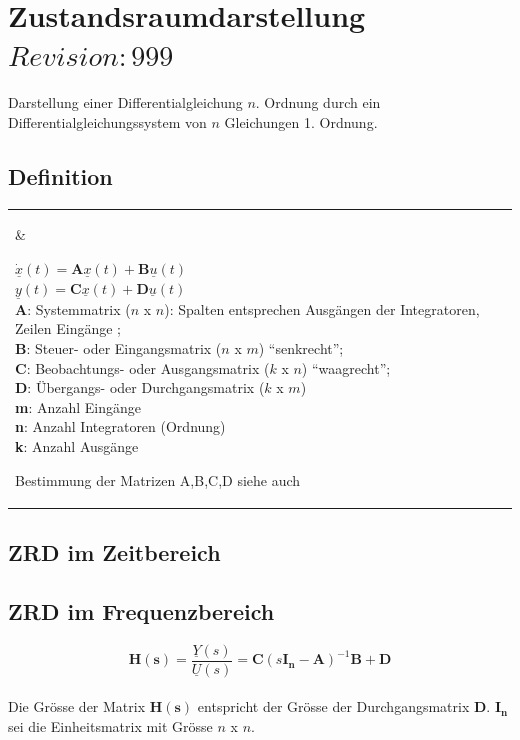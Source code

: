 \section{Zustandsraumdarstellung  \tiny{$Revision: 999 $}}
Darstellung einer Differentialgleichung $n$. Ordnung durch ein
Differentialgleichungssystem von $n$ Gleichungen 1. Ordnung.

\subsection{Definition }
\begin{tabular}{ll}
\parbox{10cm}{
	
	}
	& \parbox{8cm}{
		$\dot{\underline{x}}(t) = {\boldsymbol A} \underline{x}(t) + {\boldsymbol B}
		\underline{u}(t)$ \\
		$\underline{y}(t) = {\boldsymbol C} \underline{x}(t) + {\boldsymbol D}
		\underline{u}(t)$\\ 
		
		${\boldsymbol A}$: Systemmatrix ($n$ x $n$): Spalten entsprechen Ausgängen
		der Integratoren, Zeilen Eingänge ; \\ 
		${\boldsymbol B}$: Steuer- oder
		Eingangsmatrix ($n$ x $m$) ``senkrecht''; \\ ${\boldsymbol C}$: Beobachtungs- oder Ausgangsmatrix ($k$ x $n$)
		``waagrecht''; \\
		${\boldsymbol D}$: Übergangs- oder Durchgangsmatrix ($k$ x
		$m$)\\
		
		\textbf{m}: Anzahl Eingänge \\
		\textbf{n}: Anzahl Integratoren (Ordnung) \\
		\textbf{k}: Anzahl Ausgänge
	}
	Bestimmung der Matrizen A,B,C,D siehe auch 
 \end{tabular}

\subsection{ZRD im Zeitbereich }

\subsection{ZRD im Frequenzbereich  }
$$\boldsymbol{H(s)} = \frac{\underline{Y}(s)}{\underline{U}(s)} =
\boldsymbol{C}\left(s\boldsymbol{I_n}-\boldsymbol{A}\right)^{-1}\boldsymbol{B}+\boldsymbol{D}$$
\\
Die Grösse der Matrix $\boldsymbol {H(s)}$ entspricht der Grösse der
Durchgangsmatrix $\boldsymbol D$. $\boldsymbol{I_n}$ sei die Einheitsmatrix mit
Grösse $n$ x $n$.

